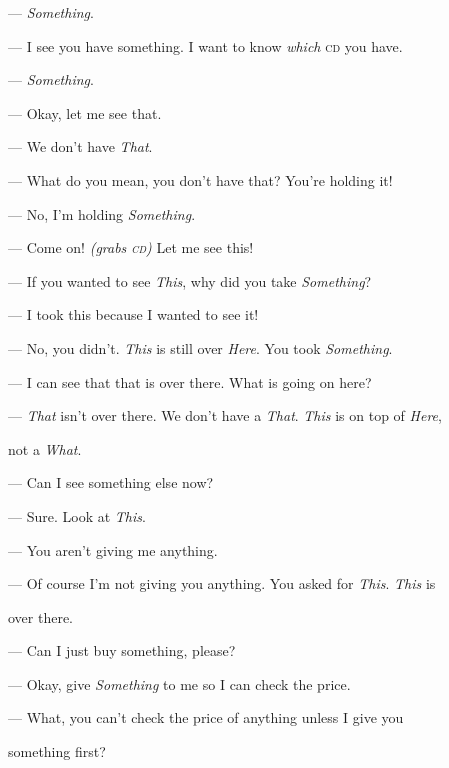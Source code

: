 \documentclass[10pt]{memoir}
\begin{document}
--- \emph{Something}.

--- I see you have something. I want to know \emph{which} \textsc{cd} you have.

--- \emph{Something}.

--- Okay, let me see that.

--- We don't have \emph{That}.

--- What do you mean, you don't have that? You're holding it!

--- No, I'm holding \emph{Something}.

--- Come on! \emph{(grabs \textsc{cd})} Let me see this!

--- If you wanted to see \emph{This}, why did you take \emph{Something}?

--- I took this because I wanted to see it!

--- No, you didn't. \emph{This} is still over \emph{Here}. You took \emph{Something}.

--- I can see that that is over there. What is going on here?

--- \emph{That} isn't over there. We don't have a \emph{That}. \emph{This} is on top of \emph{Here},

\noindent \hspace{\parindent}\hspace{1em} not a \emph{What}.

--- Can I see something else now?

--- Sure. Look at \emph{This}.

--- You aren't giving me anything.

--- Of course I'm not giving you anything. You asked for \emph{This}. \emph{This} is

\noindent \hspace{\parindent}\hspace{1em} over there.

--- Can I just buy something, please?

--- Okay, give \emph{Something} to me so I can check the price.

--- What, you can't check the price of anything unless I give you

\noindent \hspace{\parindent}\hspace{1em} something first?
\end{document}
